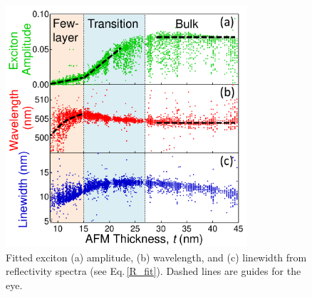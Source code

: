 \begin{figure}[ht]
\centering
\includegraphics[width=0.8\textwidth]{Fig5}
\caption[Change in exciton properties of CHPI with flake thickness.]{Fitted exciton (a) amplitude, (b) wavelength, and (c) linewidth from reflectivity spectra (see Eq.\,\ref{R_fit}). Dashed lines are guides for the eye.}
\label{5Fig5}
\end{figure}

